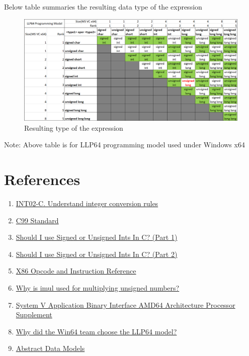 \documentclass{article}
\begin{document}
Below table summaries the resulting data type of the expression
\begin{figure}[H]
\centering
\includegraphics[width=\textwidth]{Resulting-Datatypes.png}
\caption{Resulting type of the expression}
\end{figure}

Note: Above table is for LLP64 programming model used under Windows x64

\section{References}
\begin{enumerate}[noitemsep]
\item \href{https://wiki.sei.cmu.edu/confluence/display/c/INT02-C.+Understand+integer+conversion+rules}{INT02-C. Understand integer conversion rules}
\item \href{http://www.open-std.org/jtc1/sc22/wg14/www/docs/n1256.pdf}{C99 Standard}
\item \href{http://blog.robertelder.org/signed-or-unsigned/}{Should I use Signed or Unsigned Ints In C? (Part 1)}
\item \href{http://blog.robertelder.org/signed-or-unsigned-part-2/}{Should I use Signed or Unsigned Ints In C? (Part 2)}
\item \href{http://ref.x86asm.net/coder-abc.html}{X86 Opcode and Instruction Reference}
\item \href{https://stackoverflow.com/a/42589535/2407966}{Why is imul used for multiplying unsigned numbers?}
\item \href{http://www.unix.org/version2/whatsnew/lp64_wp.html}{System V Application Binary Interface AMD64 Architecture Processor Supplement}
\item \href{https://software.intel.com/sites/default/files/article/402129/mpx-linux64-abi.pdf}{Why did the Win64 team choose the LLP64 model?}
\item \href{https://blogs.msdn.microsoft.com/oldnewthing/20050131-00/?p=36563}{Abstract Data Models}

\end{enumerate}
\end{document}

